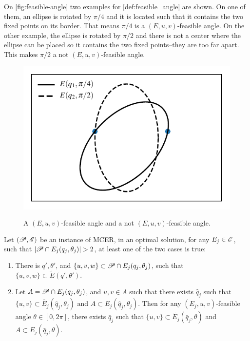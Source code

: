 On \autoref{fig:feasible-angle} two examples for \autoref{def:feasible_angle} are shown. On one of them, an ellipse is rotated by $\pi/4$ and it is located such that it contains the two fixed points on its border. That means $\pi/4$ is a $(E, u, v)$-feasible angle. On the other example, the ellipse is rotated by $\pi/2$ and there is not a center where the ellipse can be placed so it contains the two fixed points--they are too far apart. This makes $\pi/2$ a not $(E, u, v)$-feasible angle.

\begin{figure}
	\centering
	\caption{A $(E, u, v)$-feasible angle and a not $(E, u, v)$-feasible angle.}
	\includegraphics{tex/figures/scripts/feasible-angle}
	\fautor
	\label{fig:feasible-angle}
\end{figure}

\begin{lema}\label{lema:3pnts}
	Let $(\mathscr{P}, \mathscr{E})$ be an instance of MCER, in an optimal solution, for any $E_j \in \mathscr{E}$, such that $|\Pp \cap E_j(q_j, \theta_j)|>2$, at least one of the two cases is true:
	
	\begin{enumerate}
		\item There is $q', \theta'$, and $\{u, v, w\} \subset \mathscr{P} \cap E_j(q_j, \theta_j)$, such that $\{u, v, w\} \subset \tilde{E}(q', \theta')$.
		
		\item Let $A=\mathscr{P} \cap E_j(q_j, \theta_j)$, and $u, v \in A$ such that there exists $\hat{q}_j$ such that $\{u, v\} \subset \tilde{E_j}(\hat{q}_j, \theta_j)$ and $A \subset E_j(\hat{q}_j, \theta_j)$. Then for any $(E_j, u, v)$-feasible angle $\theta \in [0, 2\pi]$, there exists $\bar{q}_j$ such that $\{u, v\} \subset \tilde{E_j}(\bar{q}_j, \theta)$ and $A \subset E_j(\bar{q}_j, \theta)$.
	\end{enumerate}
\end{lema}

